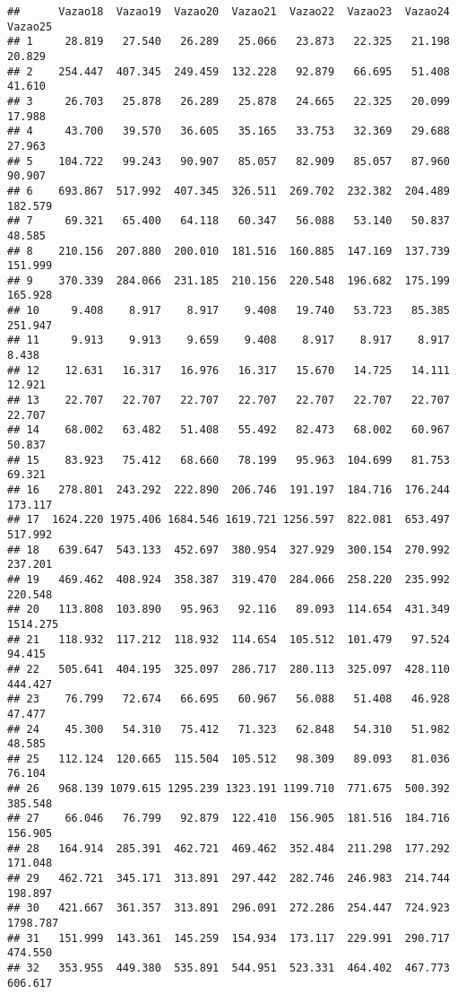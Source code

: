 \documentclass[
]{article}
\begin{document}
\begin{verbatim}
##      Vazao18  Vazao19  Vazao20  Vazao21  Vazao22  Vazao23  Vazao24  Vazao25
## 1     28.819   27.540   26.289   25.066   23.873   22.325   21.198   20.829
## 2    254.447  407.345  249.459  132.228   92.879   66.695   51.408   41.610
## 3     26.703   25.878   26.289   25.878   24.665   22.325   20.099   17.988
## 4     43.700   39.570   36.605   35.165   33.753   32.369   29.688   27.963
## 5    104.722   99.243   90.907   85.057   82.909   85.057   87.960   90.907
## 6    693.867  517.992  407.345  326.511  269.702  232.382  204.489  182.579
## 7     69.321   65.400   64.118   60.347   56.088   53.140   50.837   48.585
## 8    210.156  207.880  200.010  181.516  160.885  147.169  137.739  151.999
## 9    370.339  284.066  231.185  210.156  220.548  196.682  175.199  165.928
## 10     9.408    8.917    8.917    9.408   19.740   53.723   85.385  251.947
## 11     9.913    9.913    9.659    9.408    8.917    8.917    8.917    8.438
## 12    12.631   16.317   16.976   16.317   15.670   14.725   14.111   12.921
## 13    22.707   22.707   22.707   22.707   22.707   22.707   22.707   22.707
## 14    68.002   63.482   51.408   55.492   82.473   68.002   60.967   50.837
## 15    83.923   75.412   68.660   78.199   95.963  104.699   81.753   69.321
## 16   278.801  243.292  222.890  206.746  191.197  184.716  176.244  173.117
## 17  1624.220 1975.406 1684.546 1619.721 1256.597  822.081  653.497  517.992
## 18   639.647  543.133  452.697  380.954  327.929  300.154  270.992  237.201
## 19   469.462  408.924  358.387  319.470  284.066  258.220  235.992  220.548
## 20   113.808  103.890   95.963   92.116   89.093  114.654  431.349 1514.275
## 21   118.932  117.212  118.932  114.654  105.512  101.479   97.524   94.415
## 22   505.641  404.195  325.097  286.717  280.113  325.097  428.110  444.427
## 23    76.799   72.674   66.695   60.967   56.088   51.408   46.928   47.477
## 24    45.300   54.310   75.412   71.323   62.848   54.310   51.982   48.585
## 25   112.124  120.665  115.504  105.512   98.309   89.093   81.036   76.104
## 26   968.139 1079.615 1295.239 1323.191 1199.710  771.675  500.392  385.548
## 27    66.046   76.799   92.879  122.410  156.905  181.516  184.716  156.905
## 28   164.914  285.391  462.721  469.462  352.484  211.298  177.292  171.048
## 29   462.721  345.171  313.891  297.442  282.746  246.983  214.744  198.897
## 30   421.667  361.357  313.891  296.091  272.286  254.447  724.923 1798.787
## 31   151.999  143.361  145.259  154.934  173.117  229.991  290.717  474.550
## 32   353.955  449.380  535.891  544.951  523.331  464.402  467.773  606.617

\end{verbatim}
\end{document}
